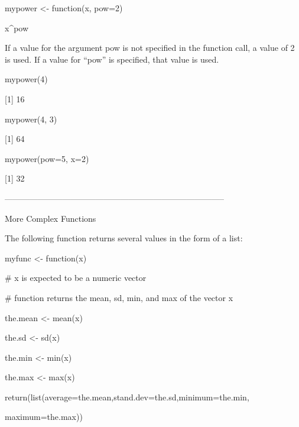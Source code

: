 mypower <- function(x, pow=2){

x^pow

}
 





If a value for the argument pow is not specified in the function call, a value of 2 is used. If a value for “pow” is specified, that value is used.









mypower(4)

[1] 16

mypower(4, 3)

[1] 64

mypower(pow=5, x=2)                                                         

[1] 32

 
 






--------------------------------------------------------------------------------


More Complex Functions

The following function returns several values in the form of a list:


myfunc <- function(x)

{

# x is expected to be a numeric vector

# function returns the mean, sd, min, and max of the vector x

the.mean <- mean(x)

the.sd <- sd(x)

the.min <- min(x)

the.max <- max(x)

return(list(average=the.mean,stand.dev=the.sd,minimum=the.min,

maximum=the.max))

}


